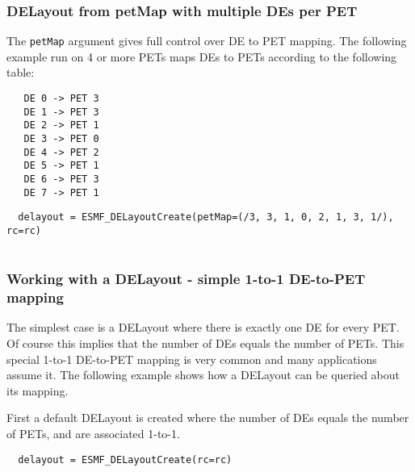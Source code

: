  

   \subsubsection{DELayout from petMap with multiple DEs per PET}
   
   The {\tt petMap} argument gives full control over DE to PET mapping. The 
   following example run on 4 or more PETs maps DEs to PETs according to the 
   following table:
   \begin{verbatim}
   DE 0 -> PET 3
   DE 1 -> PET 3
   DE 2 -> PET 1
   DE 3 -> PET 0
   DE 4 -> PET 2
   DE 5 -> PET 1
   DE 6 -> PET 3
   DE 7 -> PET 1
   \end{verbatim} 

 \begin{verbatim}
  delayout = ESMF_DELayoutCreate(petMap=(/3, 3, 1, 0, 2, 1, 3, 1/), rc=rc)
 
\end{verbatim}
 

   \subsubsection{Working with a DELayout - simple 1-to-1 DE-to-PET mapping}
   
   The simplest case is a DELayout where there is exactly one DE for every PET.
   Of course this implies that the number of DEs equals the number of PETs. 
   This special 1-to-1 DE-to-PET mapping is very common and many applications
   assume it. The following example shows how a DELayout can be queried about
   its mapping.
  
   First a default DELayout is created where the number of DEs equals the number
   of PETs, and are associated 1-to-1. 

 \begin{verbatim}
  delayout = ESMF_DELayoutCreate(rc=rc)
 
\end{verbatim}
 

